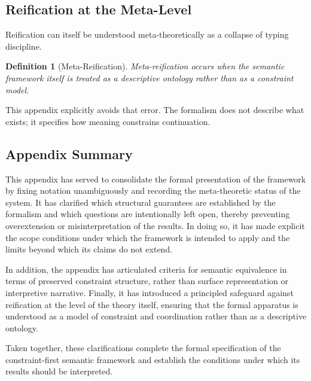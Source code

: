 \documentclass[11pt]{article}
\newtheorem{definition}{Definition}
\begin{document}
\subsection{Reification at the Meta-Level}

Reification can itself be understood meta-theoretically as a collapse of typing
discipline.

\begin{definition}[Meta-Reification]
Meta-reification occurs when the semantic framework itself is treated as a
descriptive ontology rather than as a constraint model.
\end{definition}

This appendix explicitly avoids that error. The formalism does not describe what
exists; it specifies how meaning constrains continuation.

\subsection{Appendix Summary}

This appendix has served to consolidate the formal presentation of the framework
by fixing notation unambiguously and recording the meta-theoretic status of the
system. It has clarified which structural guarantees are established by the
formalism and which questions are intentionally left open, thereby preventing
overextension or misinterpretation of the results. In doing so, it has made
explicit the scope conditions under which the framework is intended to apply and
the limits beyond which its claims do not extend.

In addition, the appendix has articulated criteria for semantic equivalence in
terms of preserved constraint structure, rather than surface representation or
interpretive narrative. Finally, it has introduced a principled safeguard against
reification at the level of the theory itself, ensuring that the formal apparatus
is understood as a model of constraint and coordination rather than as a
descriptive ontology.

Taken together, these clarifications complete the formal specification of the
constraint-first semantic framework and establish the conditions under which its
results should be interpreted.

\newpage


\end{document}
